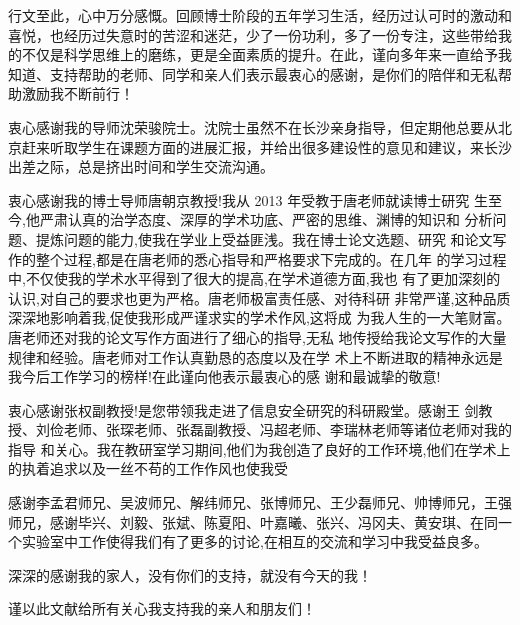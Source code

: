 

\begin{ack}
  行文至此，心中万分感慨。回顾博士阶段的五年学习生活，经历过认可时的激动和喜悦，也经历过失意时的苦涩和迷茫，少了一份功利，多了一份专注，这些带给我的不仅是科学思维上的磨练，更是全面素质的提升。在此，谨向多年来一直给予我知道、支持帮助的老师、同学和亲人们表示最衷心的感谢，是你们的陪伴和无私帮助激励我不断前行！
  
  衷心感谢我的导师沈荣骏院士。沈院士虽然不在长沙亲身指导，但定期他总要从北京赶来听取学生在课题方面的进展汇报，并给出很多建设性的意见和建议，来长沙出差之际，总是挤出时间和学生交流沟通。
  
  衷心感谢我的博士导师唐朝京教授!我从 2013 年受教于唐老师就读博士研究
  生至今,他严肃认真的治学态度、深厚的学术功底、严密的思维、渊博的知识和
  分析问题、提炼问题的能力,使我在学业上受益匪浅。我在博士论文选题、研究
  和论文写作的整个过程,都是在唐老师的悉心指导和严格要求下完成的。在几年
  的学习过程中,不仅使我的学术水平得到了很大的提高,在学术道德方面,我也
  有了更加深刻的认识,对自己的要求也更为严格。唐老师极富责任感、对待科研
  非常严谨,这种品质深深地影响着我,促使我形成严谨求实的学术作风,这将成
  为我人生的一大笔财富。唐老师还对我的论文写作方面进行了细心的指导,无私
  地传授给我论文写作的大量规律和经验。唐老师对工作认真勤恳的态度以及在学
  术上不断进取的精神永远是我今后工作学习的榜样!在此谨向他表示最衷心的感
  谢和最诚挚的敬意!
  
  衷心感谢张权副教授!是您带领我走进了信息安全研究的科研殿堂。感谢王
  剑教授、刘俭老师、张琛老师、张磊副教授、冯超老师、李瑞林老师等诸位老师对我的指导
  和关心。我在教研室学习期间,他们为我创造了良好的工作环境,他们在学术上
  的执着追求以及一丝不苟的工作作风也使我受
  
  感谢李孟君师兄、吴波师兄、解纬师兄、张博师兄、王少磊师兄、帅博师兄，王强师兄，感谢毕兴、刘毅、张斌、陈夏阳、叶嘉曦、张兴、冯冈夫、黄安琪、在同一个实验室中工作使得我们有了更多的讨论,在相互的交流和学习中我受益良多。
  
  深深的感谢我的家人，没有你们的支持，就没有今天的我！
  
  谨以此文献给所有关心我支持我的亲人和朋友们！

\end{ack}
